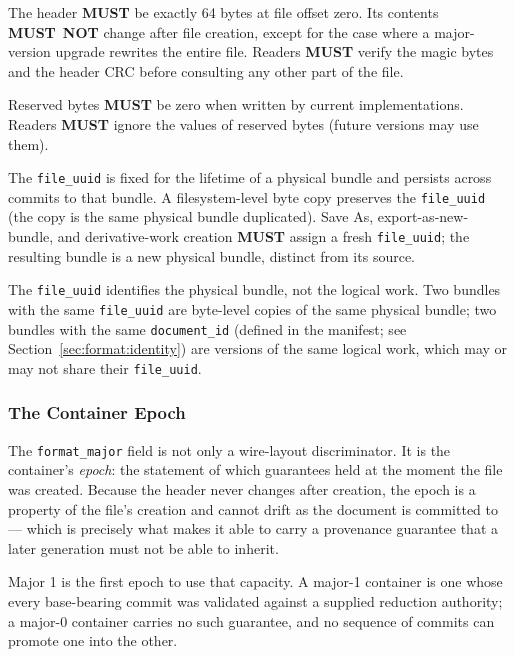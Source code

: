 \documentclass[11pt,letterpaper]{report}
\newcommand{\tablenums}[1]{{\addfontfeatures{Numbers={Lining,Tabular}}#1}}
\newcounter{requirement}[chapter]
\newcommand{\MUST}{\textbf{MUST}}
\newcommand{\MUSTNOT}{\textbf{MUST}\nobreak\ \textbf{NOT}}
\begin{document}
\begin{requirement}
  \label{req:format:fixed-header-integrity}
  The header \MUST{} be exactly 64 bytes at file offset zero. Its
  contents \MUSTNOT{} change after file creation, except for the
  case where a major-version upgrade rewrites the entire file.
  Readers \MUST{} verify the magic bytes and the header CRC before
  consulting any other part of the file.

  Reserved bytes \MUST{} be zero when written by current
  implementations. Readers \MUST{} ignore the values of reserved
  bytes (future versions may use them).

  The \texttt{file\_uuid} is fixed for the lifetime of a physical
  bundle and persists across commits to that bundle. A
  filesystem-level byte copy preserves the \texttt{file\_uuid}
  (the copy is the same physical bundle duplicated). Save As,
  export-as-new-bundle, and derivative-work creation \MUST{}
  assign a fresh \texttt{file\_uuid}; the resulting bundle is a
  new physical bundle, distinct from its source.

  The \texttt{file\_uuid} identifies the physical bundle, not the
  logical work. Two bundles with the same \texttt{file\_uuid} are
  byte-level copies of the same physical bundle; two bundles
  with the same \texttt{document\_id} (defined in the manifest;
  see Section~\ref{sec:format:identity}) are versions of the
  same logical work, which may or may not share their
  \texttt{file\_uuid}.
\end{requirement}

\subsubsection{The Container Epoch}
\label{sec:format:container-epoch}

The \texttt{format\_major} field is not only a wire-layout
discriminator. It is the container's \emph{epoch}: the statement of
which guarantees held at the moment the file was created. Because the
header never changes after creation, the epoch is a property of the
file's creation and cannot drift as the document is committed to ---
which is precisely what makes it able to carry a provenance guarantee
that a later generation must not be able to inherit.

Major \tablenums{1} is the first epoch to use that capacity. A major-1
container is one whose every base-bearing commit was validated against
a supplied reduction authority; a major-0 container carries no such
guarantee, and no sequence of commits can promote one into the other.
\end{document}
